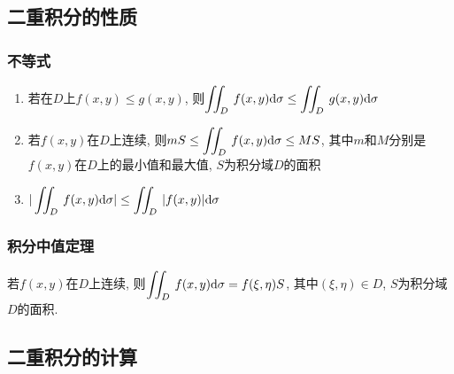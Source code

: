 \subsection{二重积分的性质}
\subsubsection{不等式}
\begin{enumerate}
    \item 若在$ D $上$ f(x,y)\le g(x,y) $, 则$ \displaystyle\iint_{D}^{}\hspace{.2em}f(x,y)\mathrm{d}\sigma\le \displaystyle\iint_{D}^{}\hspace{.2em}g(x,y)\mathrm{d}\sigma $
    \item 若$ f(x,y) $在$ D $上连续, 则$ mS\le \displaystyle\iint_{D}^{}\hspace{.2em}f(x,y)\mathrm{d}\sigma\le MS $, 其中$ m $和$ M $分别是$ f(x,y) $在$ D $上的最小值和最大值, $ S $为积分域$ D $的面积
    \item $ |\displaystyle\iint_{D}^{}\hspace{.2em}f(x,y)\mathrm{d}\sigma|\le \displaystyle\iint_{D}^{}\hspace{.2em}|f(x,y)|\mathrm{d}\sigma $
\end{enumerate}
\subsubsection{积分中值定理}
若$ f(x,y) $在$ D $上连续, 则$ \displaystyle\iint_{D}\hspace{.2em}f(x,y)\mathrm{d}\sigma=f(\xi,\eta)S $, 其中$ (\xi,\eta)\in D $, $ S $为积分域$ D $的面积.
\subsection{二重积分的计算}
